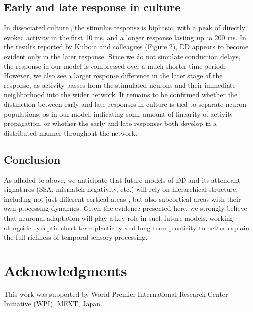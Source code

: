 \documentclass[9pt,lineno,onehalfspacing]{elife}
\begin{document}
\subsection{Early and late response in culture}

In dissociated culture \citep{Kubota2021-dx}, the stimulus response is biphasic, with a peak of directly evoked activity in the first 10 ms, and a longer response lasting up to 200 ms. In the results reported by Kubota and colleagues (Figure 2), DD appears to become evident only in the later response. Since we do not simulate conduction delays, the response in our model is compressed over a much shorter time period. However, we also see a larger response difference in the later stage of the response, as activity passes from the stimulated neurons and their immediate neighborhood into the wider network. It remains to be confirmed whether the distinction between early and late responses in culture is tied to separate neuron populations, as in our model, indicating some amount of linearity of activity propagation, or whether the early and late responses both develop in a distributed manner throughout the network.

\subsection{Conclusion}

As alluded to above, we anticipate that future models of DD and its attendant signatures (SSA, mismatch negativity, etc.) will rely on hierarchical structure, including not just different cortical areas \citep{May2015-lt, Park2020-oa}, but also subcortical areas with their own processing dynamics. Given the evidence presented here, we strongly believe that neuronal adaptation will play a key role in such future models, working alongside synaptic short-term plasticity \citep{Yarden2017-eh} and long-term plasticity \citep{Hertag2020-kc} to better explain the full richness of temporal sensory processing.

\section{Acknowledgments}

This work was supported by World Premier International Research Center Initiative (WPI), MEXT, Japan.


\end{document}

